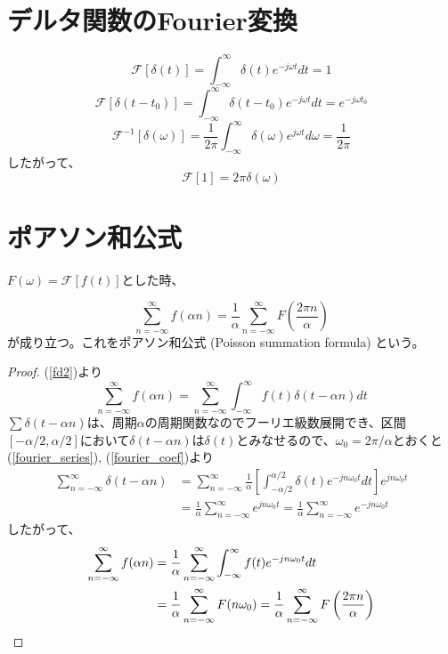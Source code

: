 \documentclass[]{jlreq}
\theoremstyle{definition}
\begin{document}
\section{デルタ関数のFourier変換}
%
\begin{equation}
  \mathcal{F}[\delta (t)] = \int_{-\infty}^{\infty} \delta (t) e^{- j \omega t} dt = 1
  \label{fd1}
\end{equation}
%
\begin{equation}
  \mathcal{F}[\delta (t - t_0)] = \int_{-\infty}^{\infty} \delta (t - t_0) e^{- j \omega t} dt = e^{-j \omega t_0}
  \label{fd2}
\end{equation}
%
\begin{equation}
  \mathcal{F}^{-1} [\delta(\omega)] = \frac{1}{2\pi}\int_{-\infty}^{\infty} \delta (\omega) e^{j \omega t } d\omega = \frac{1}{2\pi}
\end{equation}
%
したがって、
%
\begin{equation}
  \mathcal{F}[1] = 2\pi\delta(\omega)
  \label{f1}
\end{equation}
%
\section{ポアソン和公式}

$F(\omega) = \mathcal{F}[f(t)]$とした時、

\begin{equation}
  \sum_{n=-\infty}^{\infty} f(\alpha n) = \frac{1}{\alpha} \sum_{n=-\infty}^{\infty} F\left( \frac{2 \pi n}{\alpha}\right)
\end{equation}
%
が成り立つ。これをポアソン和公式 (Poisson summation formula) という。
%
\begin{proof}
  (\ref{fd2})より
  \begin{equation}
    \sum_{n=-\infty}^{\infty} f(\alpha n) = \sum_{n=-\infty}^{\infty}\int_{-\infty}^{\infty} f(t) \delta(t - \alpha n) dt
  \end{equation}
  $\sum \delta(t - \alpha n)$は、周期$\alpha$の周期関数なのでフーリエ級数展開でき、区間$[-\alpha/2, \alpha/2]$において$\delta(t-\alpha n)$は$\delta(t)$とみなせるので、$\omega_0 = 2\pi/\alpha$とおくと(\ref{fourier_series}), (\ref{fourier_coef})より
  \begin{align}
    \sum_{n=-\infty}^{\infty}\delta(t - \alpha n) 
    &= \sum_{n=-\infty}^{\infty} \frac{1}{\alpha} \left[ \int_{-\alpha/2}^{\alpha/2} \delta(t) e^{-j n\omega_0 t} dt \right] e^{j n \omega_0 t} \\
    &= \frac{1}{\alpha} \sum_{n=-\infty}^{\infty} e^{j n\omega_0 t} = \frac{1}{\alpha} \sum_{n=-\infty}^{\infty} e^{-j n\omega_0 t} 
  \end{align}
  したがって、
  \begin{align}
    \sum_{n=-\infty}^{\infty} f(\alpha n) &=\frac{1}{\alpha} \sum_{n=-\infty}^{\infty} \int_{-\infty}^{\infty} f(t) e^{-j n \omega_0 t} dt \notag\\
      &= \frac{1}{\alpha} \sum_{n=-\infty}^{\infty}F(n\omega_0) 
      = \frac{1}{\alpha} \sum_{n=-\infty}^{\infty} F\left( \frac{2 \pi n}{\alpha}\right) \notag
  \end{align}
\end{proof}
%
\end{document}
